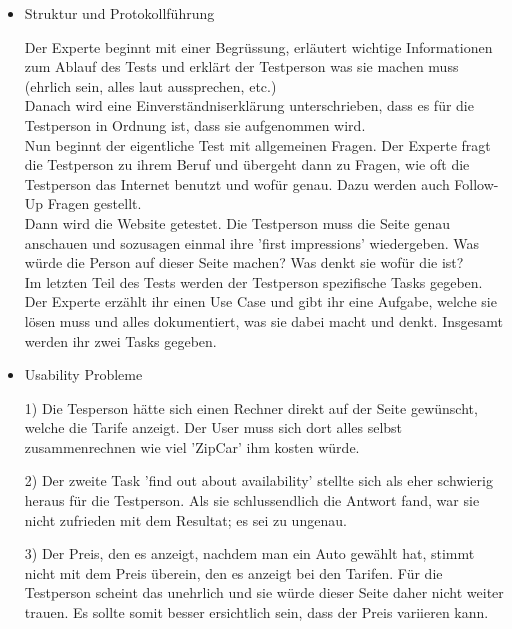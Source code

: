\begin{itemize}

    \item Struktur und Protokollführung
    
    Der Experte beginnt mit einer Begrüssung, erläutert wichtige Informationen
    zum Ablauf des Tests und erklärt der Testperson was sie machen muss (ehrlich sein,
    alles laut aussprechen, etc.)
    \\
    Danach wird eine Einverständniserklärung unterschrieben, dass es für die
    Testperson in Ordnung ist, dass sie aufgenommen wird.
    \\
    Nun beginnt der eigentliche Test mit allgemeinen Fragen. Der Experte fragt die
    Testperson zu ihrem Beruf und übergeht dann zu Fragen, wie oft die Testperson
    das Internet benutzt und wofür genau. Dazu werden auch Follow-Up Fragen gestellt. 
    \\
    Dann wird die Website getestet. Die Testperson muss die Seite genau anschauen und 
    sozusagen einmal ihre 'first impressions' wiedergeben. Was würde die Person auf dieser
    Seite machen? Was denkt sie wofür die ist?
    \\
    Im letzten Teil des Tests werden der Testperson spezifische Tasks gegeben. Der Experte
    erzählt ihr einen Use Case und gibt ihr eine Aufgabe, welche sie lösen muss und alles
    dokumentiert, was sie dabei macht und denkt. Insgesamt werden ihr zwei Tasks gegeben. 

    \item Usability Probleme
    
    1) Die Tesperson hätte sich einen Rechner direkt auf der Seite gewünscht, welche
    die Tarife anzeigt. Der User muss sich dort alles selbst zusammenrechnen
    wie viel 'ZipCar' ihm kosten würde.

    2) Der zweite Task 'find out about availability' stellte sich als eher schwierig heraus 
    für die Testperson. Als sie schlussendlich die Antwort fand, war sie nicht zufrieden mit 
    dem Resultat; es sei zu ungenau.

    3) Der Preis, den es anzeigt, nachdem man ein Auto gewählt hat, stimmt nicht mit
    dem Preis überein, den es anzeigt bei den Tarifen. Für die Testperson scheint das
    unehrlich und sie würde dieser Seite daher nicht weiter trauen. Es sollte somit 
    besser ersichtlich sein, dass der Preis variieren kann.
    
\end{itemize}